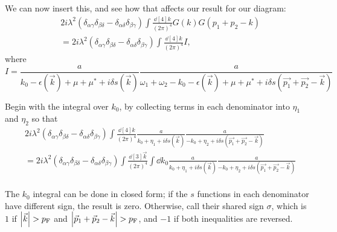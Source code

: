 \documentclass{article}
\newcommand{\corr}{\mu^\ast}
\begin{document}
We can now insert this, and see how that affects our result for our diagram:
\begin{align}
	&2 i \lambda^2 \left(\delta_{\alpha\gamma} \delta_{\beta\delta} -  \delta_{\alpha\delta} \delta_{\beta \gamma}\right)\int \frac{\dd[4]{k}}{\left(2\pi\right)^4} G(k) G(p_1 + p_2 - k) \\
	&= 2 i \lambda^2 \left(\delta_{\alpha\gamma} \delta_{\beta\delta} -  \delta_{\alpha\delta} \delta_{\beta \gamma}\right)\int \frac{\dd[4]{k}}{\left(2\pi\right)^4} I,
\end{align}
where
\begin{equation}
	I = \frac{a}{k_0 - \epsilon(\vec{k}) + \mu + \corr + i \delta s(\vec{k})} \frac{a}{\omega_1 + \omega_2 - k_0 - \epsilon(\vec{k}) + \mu + \corr + i \delta s(\vec{p_1} + \vec{p_2} - \vec{k})}
\end{equation}

Begin with the integral over $k_0$, by collecting terms in each denominator into $\eta_1$ and $\eta_2$ so that
\begin{align}
	& 2 i \lambda^2 \left(\delta_{\alpha\gamma} \delta_{\beta\delta} -  \delta_{\alpha\delta} \delta_{\beta \gamma}\right)\int \frac{\dd[4]{k}}{\left(2\pi\right)^4} \frac{a}{k_0 + \eta_1 + i \delta s(\vec{k})} \frac{a}{- k_0 + \eta_2 + i \delta s(\vec{p_1} + \vec{p_2} - \vec{k})} \\
	&= 2 i \lambda^2 \left(\delta_{\alpha\gamma} \delta_{\beta\delta} -  \delta_{\alpha\delta} \delta_{\beta \gamma}\right)\int \frac{\dd[3]{\vec{k}}}{\left(2\pi\right)^4} \int \dd{k_0} \frac{a}{k_0 + \eta_1 + i \delta s(\vec{k})} \frac{a}{ - k_0 + \eta_2 + i \delta s(\vec{p_1} + \vec{p_2} - \vec{k})} \\
\end{align}

The $k_0$ integral can be done in closed form;
if the $s$ functions in each denominator have different sign, the result is zero.
Otherwise, call their shared sign $\sigma$, which is $1$ if $\abs{\vec{k}} > p_\mathrm{F}$ and $\abs{\vec{p}_1 + \vec{p}_2 - \vec{k}} > p_\mathrm{F}$, and $-1$ if both inequalities are reversed.
\end{document}
